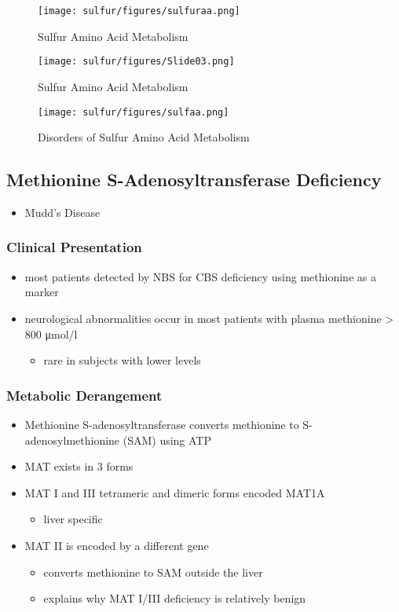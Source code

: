 \documentclass{scrartcl}
\begin{document}
\begin{figure}[htbp]
\centering
\texttt{[image: sulfur/figures/sulfuraa.png]}
\caption{\label{fig:org0e735be}Sulfur Amino Acid Metabolism}
\end{figure}

\begin{figure}[htbp]
\centering
\texttt{[image: sulfur/figures/Slide03.png]}
\caption{\label{fig:org2ad5b86}Sulfur Amino Acid Metabolism}
\end{figure}

\begin{figure}[htbp]
\centering
\texttt{[image: sulfur/figures/sulfaa.png]}
\caption{\label{fig:orgc5b184d}Disorders of Sulfur Amino Acid Metabolism}
\end{figure}

\subsection{Methionine S-Adenosyltransferase Deficiency}
\label{sec:org32ba432}
\begin{itemize}
\item Mudd’s Disease
\end{itemize}
\subsubsection{Clinical Presentation}
\label{sec:org39b4965}
\begin{itemize}
\item most patients detected by NBS for CBS deficiency using methionine as a marker
\item neurological abnormalities occur in most patients with plasma methionine \textgreater{} 800 μmol/l
\begin{itemize}
\item rare in subjects with lower levels
\end{itemize}
\end{itemize}
\subsubsection{Metabolic Derangement}
\label{sec:org8111f51}
\begin{itemize}
\item Methionine S-adenosyltransferase converts methionine to S-adenosylmethionine (SAM) using ATP
\item MAT exists in 3 forms
\item MAT I and III tetrameric and dimeric forms encoded MAT1A 
\begin{itemize}
\item liver specific
\end{itemize}
\item MAT II is encoded by a different gene
\begin{itemize}
\item converts methionine to SAM outside the liver
\item explains why MAT I/III deficiency is relatively benign
\end{itemize}
\end{itemize}
\end{document}
